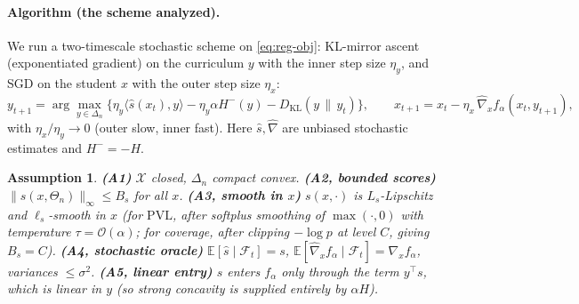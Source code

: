 \documentclass[11pt]{article}
\newtheorem{assumption}{Assumption}
\newcommand{\expect}{\mathbb{E}}
\newcommand{\simplex}{\Delta}
\newcommand{\levelset}{\Theta}     %
\newcommand{\param}{x}             %
\newcommand{\paramset}{\mathcal{X}}
\newcommand{\dist}{y}              %
\newcommand{\score}{s}             %
\newcommand{\pvl}{\mathrm{PVL}}
\newcommand{\entropy}{H}
\begin{document}
\paragraph{Algorithm (the scheme analyzed).}
We run a two-timescale stochastic scheme on \eqref{eq:reg-obj}: KL-mirror ascent (exponentiated gradient) on the curriculum $\dist$ with the inner step size $\eta_\dist$, and SGD on the student $\param$ with the outer step size $\eta_\param$:
\begin{equation}
  \dist_{t+1}=\arg\max_{\dist\in\simplex_n}\big\{\eta_\dist\langle \widehat{\score}(\param_t),\dist\rangle - \eta_\dist\alpha\entropy^{-}(\dist) - D_{\mathrm{KL}}(\dist\,\|\,\dist_t)\big\},
  \qquad
  \param_{t+1}=\param_t-\eta_\param\,\widehat{\nabla}_\param f_\alpha(\param_t,\dist_{t+1}),
  \label{eq:algo}
\end{equation}
with $\eta_\param/\eta_\dist\to0$ (outer slow, inner fast). Here $\widehat{\score},\widehat{\nabla}$ are unbiased stochastic estimates and $\entropy^{-}=-\entropy$.

\begin{assumption}\label{ass:main}
\textbf{(A1)} $\paramset$ closed, $\simplex_n$ compact convex.
\textbf{(A2, bounded scores)} $\|\score(\param,\levelset_n)\|_\infty\le B_s$ for all $\param$.
\textbf{(A3, smooth in $\param$)} $\score(\param,\cdot)$ is $L_s$-Lipschitz and $\ell_s$-smooth in $\param$ (for $\pvl$, after softplus smoothing of $\max(\cdot,0)$ with temperature $\tau=\mathcal{O}(\alpha)$; for coverage, after clipping $-\log p$ at level $C$, giving $B_s=C$).
\textbf{(A4, stochastic oracle)} $\expect[\widehat{\score}\mid\mathcal{F}_t]=\score$, $\expect[\widehat{\nabla}_\param f_\alpha\mid\mathcal{F}_t]=\nabla_\param f_\alpha$, variances $\le\sigma^2$.
\textbf{(A5, linear entry)} $\score$ enters $f_\alpha$ only through the term $\dist^{\top}\score$, which is linear in $\dist$ (so strong concavity is supplied entirely by $\alpha\entropy$).
\end{assumption}
\end{document}
